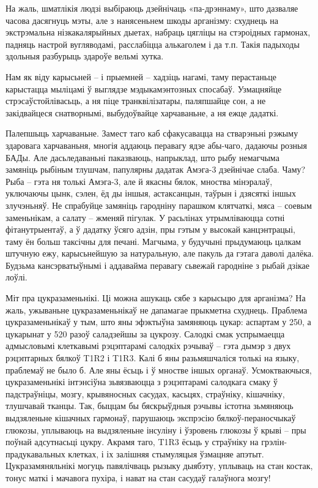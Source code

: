 На жаль, шматлікія людзі выбіраюць дзейнічаць «па-дрэннаму», што дазваляе часова дасягнуць мэты, але з нанясеньнем шкоды арганізму: схуднець на экстрэмальна нізкакалярыйных дыетах, набраць цягліцы на стэроідных гармонах, падняць настрой вугляводамі, расслабіцца алькаголем і да т.п. Такія падыходы здольныя разбурыць здароўе вельмі хутка.

Нам як віду карысьней – і прыемней – хадзіць нагамі, таму перастаньце карыстацца мыліцамі ў выглядзе мэдыкамэнтозных спосабаў. Узмацняйце стрэсаўстойлівасьць, а ня піце транквілізатары, паляпшайце сон, а не закідвайцеся снатворнымі, выбудоўвайце харчаваньне, а ня ежце дадаткі.

Палепшыць харчаваньне. Замест таго каб сфакусавацца на стварэньні рэжыму здаровага харчаваньня, многія аддаюць перавагу ядзе абы-чаго, дадаючы розныя БАДы. Але дасьледаваньні паказваюць, напрыклад, што рыбу немагчыма замяніць рыбіным тлушчам, папулярны дадатак Амэга-3 дзейнічае слаба. Чаму? Рыба – гэта ня толькі Амэга-3, але й якасны бялок, мноства мінэралаў, уключаючы цынк, сэлен, ёд ды іншыя, астаксанцын, таўрын і дзясяткі іншых злучэньняў. Не спрабуйце замяніць гародніну парашком клятчаткі, мяса – соевым заменьнікам, а салату – жменяй пігулак. У расьлінах утрымліваюцца сотні фітанутрыентаў, а ў дадатку ўсяго адзін, пры гэтым у высокай канцэнтрацыі, таму ён больш таксічны для печані. Магчыма, у будучыні прыдумаюць цалкам штучную ежу, карысьнейшую за натуральную, але пакуль да гэтага даволі далёка. Будзьма кансэрватыўнымі і аддавайма перавагу сьвежай гародніне з рыбай дзікае лоўлі.

Міт пра цукразаменьнікі. Ці можна ашукаць сябе з карысьцю для арганізма? На жаль, ужываньне цукразаменьнікаў не дапамагае прыкметна схуднець. Праблема цукразаменьнікаў у тым, што яны эфэктыўна замяняюць цукар: аспартам у 250, а цукарынат у 520 разоў саладзейшы за цукрозу. Салодкі смак успрымаецца адмысловымі клеткавымі рэцэптарамі салодкіх рэчываў – гэта дымэр з двух рэцэптарных бялкоў T1R2 і T1R3. Калі б яны разьмяшчаліся толькі на языку, праблемаў не было б. Але яны ёсьць і ў мностве іншых органаў. Усмоктваючыся, цукразаменьнікі інтэнсіўна зьвязваюцца з рэцэптарамі салодкага смаку ў падстраўніцы, мозгу, крывяносных сасудах, касьцях, страўніку, кішачніку, тлушчавай тканцы. Так, быццам бы бяскрыўдныя рэчывы істотна зьмяняюць выдзяленьне кішачных гармонаў, парушаюць экспрэсію бялкоў-пераносчыкаў глюкозы, уплываюць на выдзяленьне інсуліну і ўзровень глюкозы ў крыві – пры поўнай адсутнасьці цукру. Акрамя таго, T1R3 ёсьць у страўніку на грэлін-прадукавальных клетках, і іх залішняя стымуляцыя ўзмацняе апэтыт. Цукразамяняльнікі могуць павялічваць рызыку дыябэту, уплываць на стан костак, тонус маткі і мачавога пухіра, і нават на стан сасудаў галаўнога мозгу!

